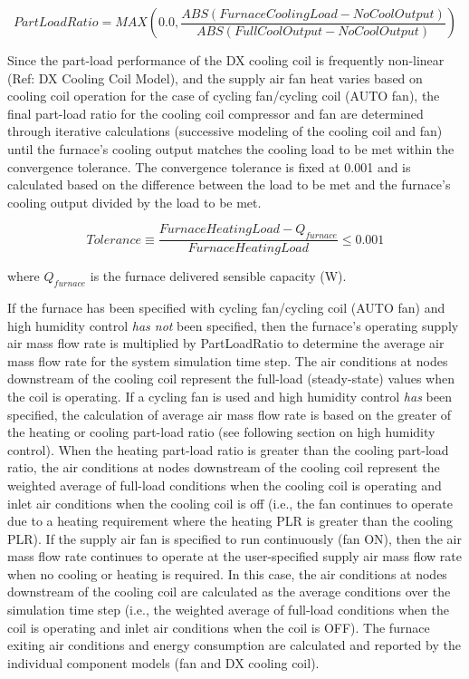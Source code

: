 \begin{equation}
PartLoadRatio = MAX\left( {0.0,\frac{{ABS\left( {FurnaceCoolingLoad - NoCoolOutput} \right)}}{{ABS\left( {FullCoolOutput - NoCoolOutput} \right)}}} \right)
\label{eq:FurnacePartLoadRatio580}
\end{equation}

Since the part-load performance of the DX cooling coil is frequently non-linear (Ref: DX Cooling Coil Model), and the supply air fan heat varies based on cooling coil operation for the case of cycling fan/cycling coil (AUTO fan), the final part-load ratio for the cooling coil compressor and fan are determined through iterative calculations (successive modeling of the cooling coil and fan) until the furnace's cooling output matches the cooling load to be met within the convergence tolerance. The convergence tolerance is fixed at 0.001 and is calculated based on the difference between the load to be met and the furnace's cooling output divided by the load to be met.

\begin{equation}
  Tolerance \equiv \frac{FurnaceHeatingLoad - Q_{furnace}}{FurnaceHeatingLoad} \leq 0.001
\end{equation}

where \({Q_{furnace}}\) is the furnace delivered sensible capacity (W).

If the furnace has been specified with cycling fan/cycling coil (AUTO fan) and high humidity control \emph{has not} been specified, then the furnace's operating supply air mass flow rate is multiplied by PartLoadRatio to determine the average air mass flow rate for the system simulation time step. The air conditions at nodes downstream of the cooling coil represent the full-load (steady-state) values when the coil is operating. If a cycling fan is used and high humidity control \emph{has} been specified, the calculation of average air mass flow rate is based on the greater of the heating or cooling part-load ratio (see following section on high humidity control). When the heating part-load ratio is greater than the cooling part-load ratio, the air conditions at nodes downstream of the cooling coil represent the weighted average of full-load conditions when the cooling coil is operating and inlet air conditions when the cooling coil is off (i.e., the fan continues to operate due to a heating requirement where the heating PLR is greater than the cooling PLR). If the supply air fan is specified to run continuously (fan ON), then the air mass flow rate continues to operate at the user-specified supply air mass flow rate when no cooling or heating is required. In this case, the air conditions at nodes downstream of the cooling coil are calculated as the average conditions over the simulation time step (i.e., the weighted average of full-load conditions when the coil is operating and inlet air conditions when the coil is OFF). The furnace exiting air conditions and energy consumption are calculated and reported by the individual component models (fan and DX cooling coil).

